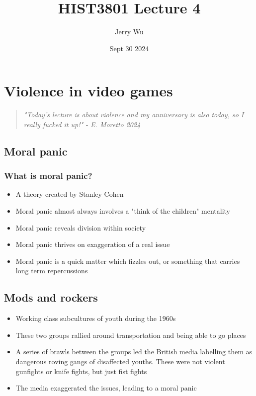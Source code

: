 \documentclass[12pt]{book}
\title{HIST3801 Lecture 4}
\author{Jerry Wu}
\date{Sept 30 2024}
\begin{document}
\maketitle

\tableofcontents

\chapter{Violence in video games}

\begin{quote}
    \textit{"Today's lecture is about violence and my anniversary is also today, so I really fucked it up!" - E. Moretto 2024}
\end{quote}

\section{Moral panic}

\subsection{What is moral panic?}

\begin{itemize}
    \item A theory created by Stanley Cohen
    \item Moral panic almost always involves a "think of the children" mentality
    \item Moral panic reveals division within society
    \item Moral panic thrives on exaggeration of a real issue
    \item Moral panic is a quick matter which fizzles out, or something that carries long term repercussions
\end{itemize}

\section{Mods and rockers}

\begin{itemize}
    \item Working class subcultures of youth during the 1960s
    \item These two groups rallied around transportation and being able to go places
    \item A series of brawls between the groups led the British media labelling them as dangerous roving gangs of disaffected youths. These were not violent gunfights or knife fights, but just fist fights
    \item The media exaggerated the issues, leading to a moral panic
\end{itemize}
\end{document}
